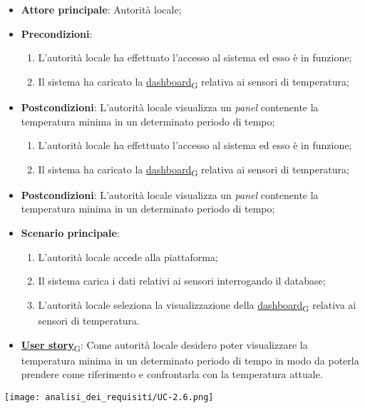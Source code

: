 \begin{itemize}
	\item \textbf{Attore principale}: Autorità locale;
	\item \textbf{Precondizioni}:
	      \begin{enumerate}
		      \item L'autorità locale ha effettuato l'accesso al sistema ed esso è in funzione;
		      \item Il sistema ha caricato la \href{https://7last.github.io/docs/rtb/documentazione-interna/glossario\#dashboard}{dashboard\textsubscript{G}} relativa ai sensori di temperatura;
	      \end{enumerate}
	\item \textbf{Postcondizioni}: L'autorità locale visualizza un \textit{panel} contenente la temperatura minima in un determinato periodo di tempo;
	      \begin{enumerate}
		      \item L'autorità locale ha effettuato l'accesso al sistema ed esso è in funzione;
		      \item Il sistema ha caricato la \href{https://7last.github.io/docs/rtb/documentazione-interna/glossario\#dashboard}{dashboard\textsubscript{G}} relativa ai sensori di temperatura;
	      \end{enumerate}
	\item \textbf{Postcondizioni}: L'autorità locale visualizza un \textit{panel} contenente la temperatura minima in un determinato periodo di tempo;
	\item \textbf{Scenario principale}:
	      \begin{enumerate}
		      \item L'autorità locale accede alla piattaforma;
		      \item Il sistema carica i dati relativi ai sensori interrogando il database;
		      \item L'autorità locale seleziona la visualizzazione della \href{https://7last.github.io/docs/rtb/documentazione-interna/glossario\#dashboard}{dashboard\textsubscript{G}} relativa ai sensori di temperatura.
	      \end{enumerate}
	\item \href{https://7last.github.io/docs/rtb/documentazione-interna/glossario\#user-story}{\textbf{User story}\textsubscript{G}}:
	      Come autorità locale desidero poter visualizzare la temperatura minima in un determinato periodo di tempo
	      in modo da poterla prendere come riferimento e confrontarla con la temperatura attuale.
\end{itemize}
\begin{center}
	\texttt{[image: analisi\_dei\_requisiti/UC-2.6.png]}
\end{center}

